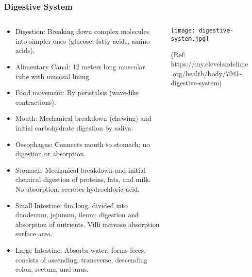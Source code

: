 \begin{frame}[fragile]\frametitle{Digestive System}
\begin{columns}
    \begin{column}[T]{0.5\linewidth}
      \begin{itemize}
		\item Digestion: Breaking down complex molecules into simpler ones (glucose, fatty acids, amino acids).
		\item Alimentary Canal: 12 meters long muscular tube with mucosal lining.
		\item Food movement: By peristalsis (wave-like contractions).
		\item Mouth: Mechanical breakdown (chewing) and initial carbohydrate digestion by saliva.
		\item Oesophagus: Connects mouth to stomach; no digestion or absorption.
		\item Stomach: Mechanical breakdown and initial chemical digestion of proteins, fats, and milk. No absorption; secretes hydrochloric acid.
		\item Small Intestine: 6m long, divided into duodenum, jejunum, ileum; digestion and absorption of nutrients. Villi increase absorption surface area.
		\item Large Intestine: Absorbs water, forms feces; consists of ascending, transverse, descending colon, rectum, and anus.
	  \end{itemize}
    \end{column}
    \begin{column}[T]{0.5\linewidth}
		\begin{center}
		\texttt{[image: digestive-system.jpg]}
		
		{\tiny (Ref: https://my.clevelandclinic.org/health/body/7041-digestive-system)}
		\end{center}	
    \end{column}
  \end{columns}
\end{frame}

